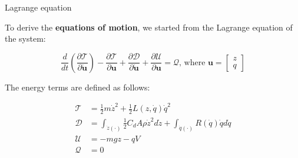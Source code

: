 \begin{frame}{Lagrange equation}

    To derive the \textbf{equations of motion}, we started from the Lagrange equation of the system:

    \begin{equation}
        \frac{d}{dt} \left( \frac{\partial \mathcal{T}}{\partial \dot{\mathbf{u}}} \right) - \frac{\partial \mathcal{T}}{\partial \mathbf{u}} + \frac{\partial \mathcal{D}}{\partial \dot{\mathbf{u}}} + \frac{\partial \mathcal{U}}{\partial \mathbf{u}} = \mathcal{Q}
        \text{, where }
        \mathbf{u} = \begin{bmatrix} z \\ q \end{bmatrix}
        \label{eq:lagrange_equation}
    \end{equation}

    The energy terms are defined as follows:

    \begin{equation}
        \begin{aligned}
            \mathcal{T} & = \frac{1}{2} m \dot{z}^2 + \frac{1}{2} L(z, \dot{q}) \dot{q}^2                                                       \\
            \mathcal{D} & = \int_{\dot{z}(\cdot)} \frac{1}{2} C_d A \rho \dot{z}^2 d\dot{z} + \int_{\dot{q}(\cdot)} R(\dot{q}) \dot{q} d\dot{q} \\
            \mathcal{U} & = -m g z - q V                                                                                                        \\
            \mathcal{Q} & = 0
        \end{aligned}
    \end{equation}

\end{frame}



